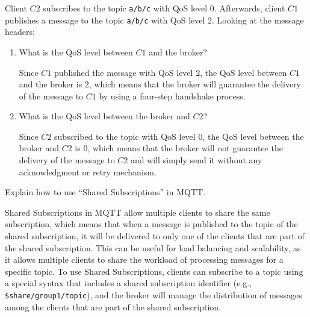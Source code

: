 \begin{ejercicio}
    Client $C2$ subscribes to the topic \texttt{a/b/c} with QoS level 0. Afterwards, client $C1$ publishes a message to the topic \texttt{a/b/c} with QoS level 2. Looking at the message headers:
    \begin{enumerate}
        \item What is the QoS level between $C1$ and the broker?
        
        Since $C1$ published the message with QoS level 2, the QoS level between $C1$ and the broker is 2, which means that the broker will guarantee the delivery of the message to $C1$ by using a four-step handshake process.
        \item What is the QoS level between the broker and $C2$?
        
        Since $C2$ subscribed to the topic with QoS level 0, the QoS level between the broker and $C2$ is 0, which means that the broker will not guarantee the delivery of the message to $C2$ and will simply send it without any acknowledgment or retry mechanism.
    \end{enumerate}
\end{ejercicio}

\begin{ejercicio}
    Explain how to use ``Shared Subscriptions'' in MQTT.

    Shared Subscriptions in MQTT allow multiple clients to share the same subscription, which means that when a message is published to the topic of the shared subscription, it will be delivered to only one of the clients that are part of the shared subscription. This can be useful for load balancing and scalability, as it allows multiple clients to share the workload of processing messages for a specific topic. To use Shared Subscriptions, clients can subscribe to a topic using a special syntax that includes a shared subscription identifier (e.g., \texttt{\$share/group1/topic}), and the broker will manage the distribution of messages among the clients that are part of the shared subscription.
\end{ejercicio}